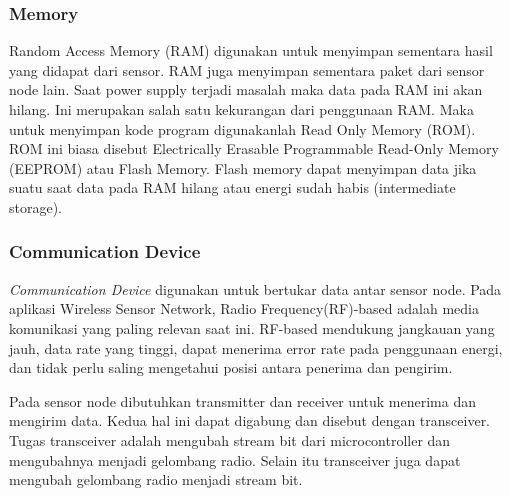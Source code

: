 \subsubsection{Memory}
Random Access Memory (RAM) digunakan untuk menyimpan sementara hasil yang didapat dari sensor. RAM juga menyimpan sementara paket dari sensor node lain. Saat power supply terjadi masalah maka data pada RAM ini akan hilang. Ini merupakan salah satu kekurangan dari penggunaan RAM. Maka untuk menyimpan kode program digunakanlah Read Only Memory (ROM). ROM ini biasa disebut Electrically Erasable Programmable Read-Only Memory (EEPROM) atau Flash Memory. Flash memory dapat menyimpan data jika suatu saat data pada RAM hilang atau energi sudah habis (intermediate storage).

\subsubsection{Communication Device}
\textit{Communication Device} digunakan untuk bertukar data antar sensor node. Pada aplikasi Wireless Sensor Network, Radio Frequency(RF)-based adalah media komunikasi yang paling relevan saat ini. RF-based mendukung jangkauan yang jauh, data rate yang tinggi, dapat menerima error rate pada penggunaan energi, dan tidak perlu saling mengetahui posisi antara penerima dan pengirim.

Pada sensor node dibutuhkan transmitter dan receiver untuk menerima dan mengirim data. Kedua hal ini dapat digabung dan disebut dengan transceiver. Tugas transceiver adalah mengubah stream bit dari microcontroller dan mengubahnya menjadi gelombang radio. Selain itu transceiver juga dapat mengubah gelombang radio menjadi stream bit.

